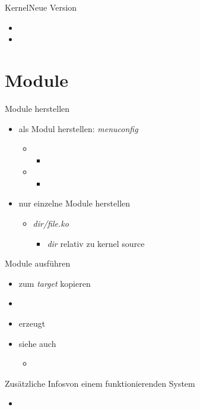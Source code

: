 \begin{frame}{Kernel}{Neue Version}
\begin{itemize}
 \item {}
 \item {}
\end{itemize}
\end{frame}

\section{Module}

\begin{frame}{Module herstellen}
 \begin{itemize}
  \item als Modul herstellen: {\em menuconfig}
  \begin{itemize}
   \item {}
   \begin{itemize}\item{}\end{itemize}
   \item {}
   \begin{itemize}\item{}\end{itemize}
  \end{itemize}
  \item nur einzelne Module herstellen
  \begin{itemize}
   \item {\em dir/file.ko}
   \begin{itemize}
    \item {\em dir} relativ zu kernel source
   \end{itemize}
  \end{itemize}
 \end{itemize}
\end{frame}

\begin{frame}{Module ausführen}
 \begin{itemize}
  \item zum {\em target} kopieren
  \item {}
  \item {} erzeugt 
  \item siehe auch
   \begin{itemize}\item{}\end{itemize}
 \end{itemize}
\end{frame}

\begin{frame}{Zusätzliche Infos}{von einem funktionierenden System}
 \begin{itemize}
  \item {}
  \ite {}
 \end{itemize}
\end{frame}
